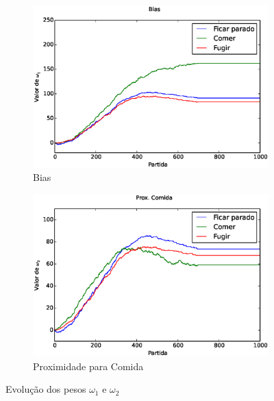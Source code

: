 \begin{figure}[H]
	\centering
	\begin{subfigure}[t]{.5\textwidth}
		\centering
		\includegraphics[width=\linewidth]{images/3_behaviors_original_map/weights____pol__Bias}
		\caption{Bias}
		\label{img:3ComportamentosMapaOriginal:PesoBias}
	\end{subfigure}%
	\begin{subfigure}[t]{.5\textwidth}
		\centering
		\includegraphics[width=\linewidth]{images/3_behaviors_original_map/weights____pol__DistComida}
		\caption{Proximidade para Comida}
		\label{img:3ComportamentosMapaOriginal:PesoDistComida}
	\end{subfigure}
	\caption{Evolução dos pesos $ \omega_1 $ e $ \omega_2 $}
	\label{img:3ComportamentosMapaOriginal:PesoBiasAndDistComida}
\end{figure}

